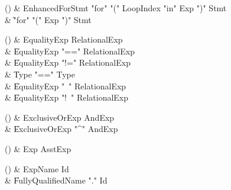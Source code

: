 \begin{bbgrammarappendix}{3.5in}

() & EnhancedForStmt \label{prod:EnhancedForStmt}  \: \xcd"for" \xcd"(" LoopIndex \xcd"in" Exp \xcd")" Stmt  \\

 &    \| \xcd"for" \xcd"(" Exp \xcd")" Stmt \\

\end{bbgrammarappendix}

\begin{bbgrammarappendix}{3.9in}

() & EqualityExp \label{prod:EqualityExp}  \: RelationalExp  \\

 &    \| EqualityExp \xcd"==" RelationalExp \\
 &    \| EqualityExp \xcd"!=" RelationalExp \\
 &    \| Type  \xcd"==" Type  \\
 &    \| EqualityExp \xcd"~" RelationalExp \\
 &    \| EqualityExp \xcd"!~" RelationalExp \\

\end{bbgrammarappendix}

\begin{bbgrammarappendix}{3.6in}

() & ExclusiveOrExp \label{prod:ExclusiveOrExp}  \: AndExp  \\

 &    \| ExclusiveOrExp \xcd"^" AndExp \\

\end{bbgrammarappendix}

\begin{bbgrammarappendix}{4.7in}

() & Exp \label{prod:Exp}  \: AsstExp  \\


\end{bbgrammarappendix}

\begin{bbgrammarappendix}{4.3in}

() & ExpName \label{prod:ExpName}  \: Id  \\

 &    \| FullyQualifiedName \xcd"." Id \\

\end{bbgrammarappendix}


